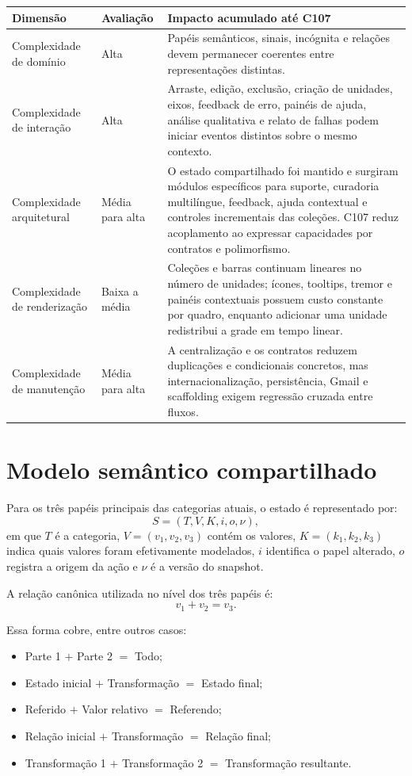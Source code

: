 \documentclass[12pt,a4paper]{article}
\begin{document}
\begin{tabularx}{\textwidth}{p{3.8cm}p{2.8cm}X}
\toprule
\textbf{Dimensão} & \textbf{Avaliação} & \textbf{Impacto acumulado até C107}\\
\midrule
Complexidade de domínio & Alta & Papéis semânticos, sinais, incógnita e relações devem permanecer coerentes entre representações distintas.\\
Complexidade de interação & Alta & Arraste, edição, exclusão, criação de unidades, eixos, feedback de erro, painéis de ajuda, análise qualitativa e relato de falhas podem iniciar eventos distintos sobre o mesmo contexto.\\
Complexidade arquitetural & Média para alta & O estado compartilhado foi mantido e surgiram módulos específicos para suporte, curadoria multilíngue, feedback, ajuda contextual e controles incrementais das coleções. C107 reduz acoplamento ao expressar capacidades por contratos e polimorfismo.\\
Complexidade de renderização & Baixa a média & Coleções e barras continuam lineares no número de unidades; ícones, tooltips, tremor e painéis contextuais possuem custo constante por quadro, enquanto adicionar uma unidade redistribui a grade em tempo linear.\\
Complexidade de manutenção & Média para alta & A centralização e os contratos reduzem duplicações e condicionais concretos, mas internacionalização, persistência, Gmail e scaffolding exigem regressão cruzada entre fluxos.\\
\bottomrule
\end{tabularx}

\section{Modelo semântico compartilhado}

Para os três papéis principais das categorias atuais, o estado é representado por:
\[
S = (T, V, K, i, o, \nu),
\]
em que $T$ é a categoria, $V=(v_1,v_2,v_3)$ contém os valores, $K=(k_1,k_2,k_3)$ indica quais valores foram efetivamente modelados, $i$ identifica o papel alterado, $o$ registra a origem da ação e $\nu$ é a versão do snapshot.

A relação canônica utilizada no nível dos três papéis é:
\[
v_1 + v_2 = v_3.
\]

Essa forma cobre, entre outros casos:
\begin{itemize}[noitemsep]
  \item Parte 1 $+$ Parte 2 $=$ Todo;
  \item Estado inicial $+$ Transformação $=$ Estado final;
  \item Referido $+$ Valor relativo $=$ Referendo;
  \item Relação inicial $+$ Transformação $=$ Relação final;
  \item Transformação 1 $+$ Transformação 2 $=$ Transformação resultante.
\end{itemize}
\end{document}

